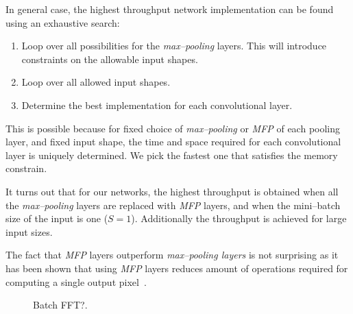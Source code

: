 \documentclass[conference]{./IEEEtran/IEEEtran}
\begin{document}
  In general case, the highest throughput network implementation can
  be found using an exhaustive search:

  \begin{enumerate}
    \item Loop over all possibilities for the \emph{max--pooling}
      layers.  This will introduce constraints on the allowable input
      shapes.
    \item Loop over all allowed input shapes.
    \item Determine the best implementation for each convolutional
      layer.
  \end{enumerate}

  This is possible because for fixed choice of \emph{max--pooling} or
  \emph{MFP} of each pooling layer, and fixed input shape, the time
  and space required for each convolutional layer is uniquely
  determined.  We pick the fastest one that satisfies the memory
  constrain.

  It turns out that for our networks, the highest throughput is
  obtained when all the \emph{max--pooling} layers are replaced with
  \emph{MFP} layers, and when the mini--batch size of the input is one
  ($S = 1$).  Additionally the throughput is achieved for large input
  sizes.

  The fact that \emph{MFP} layers outperform \emph{max--pooling
    layers} is not surprising as it has been shown that using
  \emph{MFP} layers reduces amount of operations required for
  computing a single output pixel~\cite{giusti2013fast,masci2013fast}.


  \begin{figure}
    \centering
    \caption{Batch FFT?.}
    \label{fig:fftbatch}
  \end{figure}
\end{document}

